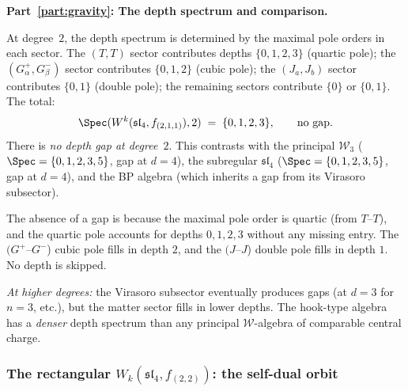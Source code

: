\begin{computation}
\medskip
\noindent\textbf{Part~\ref{part:gravity}: The depth spectrum and
comparison.}

At degree~$2$, the depth spectrum is determined by the
maximal pole orders in each sector. The $(T,T)$ sector
contributes depths $\{0,1,2,3\}$ (quartic pole);
the $(G^+_\alpha, G^-_\beta)$ sector contributes
$\{0,1,2\}$ (cubic pole);
the $(J_a, J_b)$ sector contributes $\{0,1\}$
(double pole);
the remaining sectors contribute $\{0\}$ or $\{0,1\}$.
The total:
\begin{equation}\label{eq:sl4hook-spec-2}
\Spec(W^k(\mathfrak{sl}_4, f_{(2,1,1)}), 2)
\;=\;
\{0, 1, 2, 3\},
\qquad
\text{no gap.}
\end{equation}
There is \emph{no depth gap at degree~$2$}. This
contrasts with the principal $\mathcal W_3$
($\Spec = \{0,1,2,3,5\}$, gap at $d=4$), the subregular
$\mathfrak{sl}_4$ ($\Spec = \{0,1,2,3,5\}$, gap at
$d=4$), and the BP algebra (which inherits a gap from
its Virasoro subsector).

The absence of a gap is because the maximal pole order
is quartic (from $T$--$T$), and the quartic pole
accounts for depths $0,1,2,3$ without any missing entry.
The $(G^+$--$G^-$) cubic pole fills in depth $2$, and
the $(J$--$J$) double pole fills in depth $1$. No depth
is skipped.

\emph{At higher degrees:} the Virasoro subsector
eventually produces gaps (at $d=3$ for $n=3$, etc.),
but the matter sector fills in lower depths. The
hook-type algebra has a \emph{denser} depth spectrum
than any principal $\mathcal W$-algebra of comparable
central charge.
\end{computation}

\subsubsection{The rectangular
$W_k(\mathfrak{sl}_4,f_{(2,2)})$: the self-dual orbit}
\label{subsubsec:ordered-bar-sl4-rectangular}

